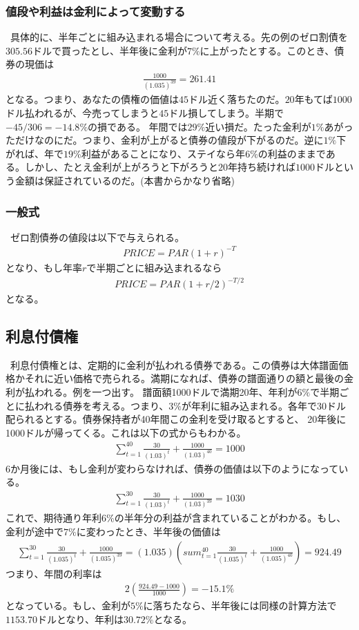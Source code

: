 \documentclass[a4j,12pt]{jarticle}
\begin{document}
\subsubsection{値段や利益は金利によって変動する}
\ 具体的に、半年ごとに組み込まれる場合について考える。先の例のゼロ割債を$305.56$ドルで買ったとし、半年後に金利が$7\%$に上がったとする。このとき、債券の現価は
\begin{align*}
\frac{1000}{(1.035)^{39}} = 261.41
\end{align*}
となる。つまり、あなたの債権の価値は$45$ドル近く落ちたのだ。$20$年もてば$1000$ドル払われるが、今売ってしまうと$45$ドル損してしまう。半期で$-45/306 = -14.8\%$の損である。
年間では$29\%$近い損だ。たった金利が$1\%$あがっただけなのにだ。つまり、金利が上がると債券の値段が下がるのだ。逆に$1\%$下がれば、年で$19\%$利益があることになり、ステイなら年$6\%$の利益のままである。しかし、たとえ金利が上がろうと下がろうと$20$年持ち続ければ$1000$ドルという金額は保証されているのだ。(本書からかなり省略)
\subsubsection{一般式}
\ ゼロ割債券の値段は以下で与えられる。
\begin{align*}
PRICE = PAR(1 + r)^{-T}
\end{align*}
となり、もし年率$r$で半期ごとに組み込まれるなら
\begin{align*}
PRICE = PAR(1 + r/2)^{-T/2}
\end{align*}
となる。
\subsection{利息付債権}
\ 利息付債権とは、定期的に金利が払われる債券である。この債券は大体譜面価格かそれに近い価格で売られる。満期になれば、債券の譜面通りの額と最後の金利が払われる。例を一つ出す。
譜面額1000ドルで満期20年、年利が6$\%$で半期ごとに払われる債券を考える。つまり、$3\%$が年利に組み込まれる。各年で30ドル配られるとする。債券保持者が40年間この金利を受け取るとすると、
20年後に1000ドルが帰ってくる。これは以下の式からもわかる。
\begin{align*}
\sum_{t=1}^{40}\frac{30}{(1.03)^{t}} + \frac{1000}{(1.03)^40} = 1000
\end{align*}
6か月後には、もし金利が変わらなければ、債券の価値は以下のようになっている。
\begin{align*}
\sum_{t=1}^{30}\frac{30}{(1.03)^{t}} + \frac{1000}{(1.03)^39} = 1030
\end{align*}
これで、期待通り年利6$\%$の半年分の利益が含まれていることがわかる。もし、金利が途中で$7\%$に変わったとき、半年後の価値は
\begin{align*}
\sum_{t=1}^{30}\frac{30}{(1.035)^{t}} + \frac{1000}{(1.035)^39} = (1.035)\left(sum_{t=1}^{40}\frac{30}{(1.035)^{t}} + \frac{1000}{(1.035)^40}\right) = 924.49
\end{align*}
つまり、年間の利率は
\begin{align*}
2\left(\frac{924.49 - 1000}{1000}\right) = -15.1\%
\end{align*}
となっている。もし、金利が$5\%$に落ちたなら、半年後には同様の計算方法で$1153.70$ドルとなり、年利は$30.72\%$となる。
\end{document}
